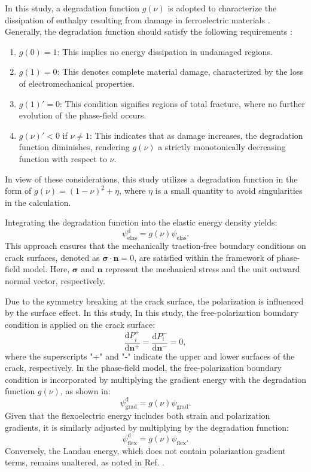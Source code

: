 \documentclass[final,times,fleqn,11pt]{elsarticle}
\begin{document}
In this study, a degradation function $g(\nu)$ is adopted to characterize the dissipation of enthalpy resulting from damage in ferroelectric materials \cite{abdollahi_phase-field_2011,xu_fracture_2010}. Generally, the degradation function should satisfy the following requirements \cite{miehe_thermodynamically_2010}:
\begin{enumerate}
    \item $g(0) = 1 $: This implies no energy dissipation in undamaged regions.
    \item $g(1) = 0 $: This denotes complete material damage, characterized by the loss of electromechanical properties.
    \item $g(1)' = 0$: This condition signifies regions of total fracture, where no further evolution of the phase-field occurs.
    \item $g(\nu)'<0$ if $\nu\neq 1$: This indicates that as damage increases, the degradation function diminishes, rendering $g(\nu)$ a strictly monotonically decreasing function with respect to $\nu$.
\end{enumerate}
In view of these considerations, this study utilizes a degradation function in the form of $g(\nu)=(1-\nu)^2+\eta$, where $\eta$ is a small quantity to avoid singularities in the calculation. 

Integrating the degradation function into the elastic energy density yields:
\begin{equation}
    \psi_{\mathrm{elas}}^\mathrm{d}=g(\nu)\psi_{\mathrm{elas}}.
\end{equation}
This approach ensures that the mechanically traction-free boundary conditions on crack surfaces, denoted as $\mathbf{\sigma}\cdot\mathbf{n}=0$, are satisfied within the framework of phase-field model. Here, $\mathbf{\sigma}$ and $\mathbf{n}$ represent the mechanical stress and the unit outward normal vector, respectively.

Due to the symmetry breaking at the crack surface, the polarization is influenced by the surface effect. In this study, In this study, the free-polarization boundary condition is applied on the crack surface:
\begin{equation}
    \frac{\mathrm{d}P_i^+}{\mathrm{d}\mathbf{n}^+}=\frac{\mathrm{d}P_i^-}{\mathrm{d}\mathrm{\mathbf{n}^-}}=0,
\end{equation}
where the superscripts "+" and "-" indicate the upper and lower surfaces of the crack, respectively. In the phase-field model, the free-polarization boundary condition is incorporated by multiplying the gradient energy with the degradation function $g(\nu)$, as shown in:
\begin{equation}
    \psi_\mathrm{grad}^\mathrm{d}=g(\nu)\psi_\mathrm{grad}.
\end{equation}
Given that the flexoelectric energy includes both strain and polarization gradients, it is similarly adjusted by multiplying by the degradation function:
\begin{equation}
    \psi_{\mathrm{flex}}^\mathrm{d}=g(\nu) \psi_{\mathrm{flex}}.
\end{equation}
Conversely, the Landau energy, which does not contain polarization gradient terms, remains unaltered, as noted in Ref. \cite{abdollahi_phase-field_2011}.
\end{document}
